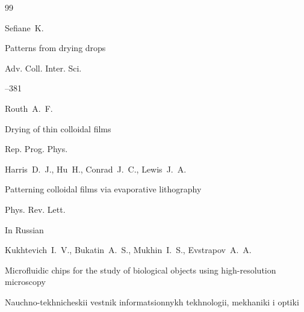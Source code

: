\begin{thebibliography}{99}




\by Sefiane~K. 

\paper Patterns from drying drops 

\jour Adv. Coll. Inter. Sci.



--381





\by Routh~A.~F. 

\paper Drying of thin colloidal films 

\jour Rep. Prog. Phys. 









\by Harris~D.~J., Hu~H., Conrad~J.~C., Lewis~J.~A.

\paper Patterning colloidal films via evaporative lithography 

\jour Phys. Rev.  Lett. 









\lang In Russian

\by Kukhtevich~I.~V., Bukatin~A.~S., Mukhin~I.~S., Evstrapov~A.~A.

\paper  Microfluidic chips for the study of biological objects using high-resolution microscopy

\jour Nauchno-tekhnicheskii vestnik informatsionnykh tekhnologii, mekhaniki i optiki





\end{thebibliography}
